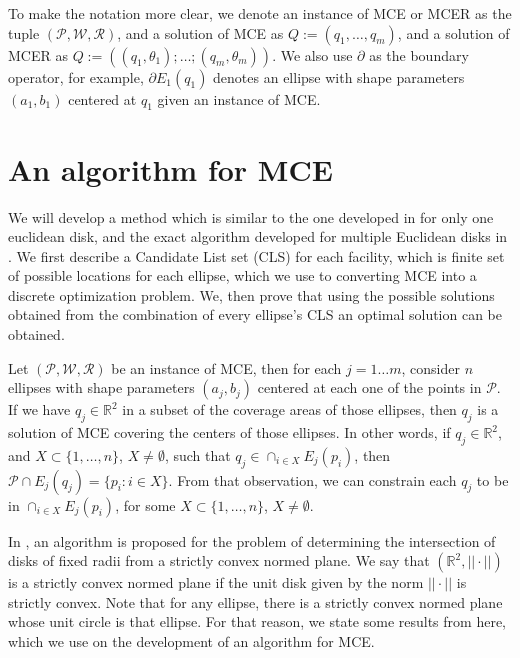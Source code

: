 \documentclass[a4]{elsarticle}
\newcommand{\R}{\mathbb{R}}
\newcommand{\Pp}{\mathscr{P}}
\newcommand{\Ww}{\mathscr{W}}
\newcommand{\Rr}{\mathscr{R}}
\begin{document}
To make the notation more clear, we denote an instance of MCE or MCER as the tuple $(\Pp, \Ww, \Rr)$, and a solution of MCE as $Q:=(q_1, \dots, q_m)$, and a solution of MCER as $Q:=((q_1, \theta_1); \dots; (q_m, \theta_m))$. We also use $\partial$ as the boundary operator, for example, $\partial E_1(q_1)$ denotes an ellipse with shape parameters $(a_1, b_1)$ centered at $q_1$ given an instance of MCE.

\section{An algorithm for MCE}

We will develop a method which is similar to the one developed in \cite{drezner} for only one euclidean disk, and the exact algorithm developed for multiple Euclidean disks in \cite{cabello:2006}. 
We first describe a Candidate List set (CLS) for each facility, which is finite set of possible locations for each ellipse, which we use to converting MCE into a discrete optimization problem. We, then prove that using the possible solutions obtained from the combination of every ellipse's CLS an optimal solution can be obtained.


Let $(\Pp, \Ww, \Rr)$ be an instance of MCE, then for each $j=1\dots m$, consider $n$ ellipses with shape parameters $(a_j, b_j)$ centered at each one of the points in $\Pp$. If we have $q_j\in\R^2$ in a subset of the coverage areas of those ellipses, then $q_j$ is a solution of MCE covering the centers of those ellipses. In other words, if $q_j \in \R^2$, and $X \subset \{1, \dots, n\}$, $X \neq \emptyset$, such that $q_j \in \cap_{i\in X}E_j(p_i)$, then $\Pp \cap E_j(q_j) = \{p_i \colon i \in X\}$.
From that observation, we can constrain each $q_j$ to be in $\cap_{i\in X} E_j(p_i)$, for some $X \subset \{1, \dots,n\}$, $X \neq \emptyset$.

In \cite{bi}, an algorithm is proposed for the problem of determining the intersection of disks of fixed radii from a strictly convex normed plane. 
We say that $(\R^2, ||\cdot||)$ is a strictly convex normed plane if the unit disk given by the norm $||\cdot||$ is strictly convex. Note that for any ellipse, there is a strictly convex normed plane whose unit circle is that ellipse.
For that reason, we state some results from \cite{bi} here, which we use on the development of an algorithm for MCE.
\end{document}
